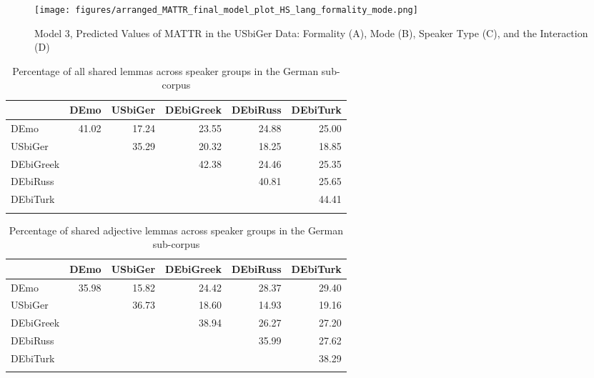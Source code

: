 \documentclass[output=paper,colorlinks,citecolor=brown]{langscibook}
\begin{document}
\begin{figure}[ht]
  \centering
  \texttt{[image: figures/arranged\_MATTR\_final\_model\_plot\_HS\_lang\_formality\_mode.png]}
  \caption{Model 3, Predicted Values of MATTR in the USbiGer Data: Formality (A), Mode (B), Speaker Type (C), and the Interaction (D)}
  \label{fig:kelleretal:MATTR_formality_mode_speakertype_USHGer}
\end{figure}

\begin{table}
\centering
\caption{Percentage of all shared lemmas across speaker groups in the German sub-corpus}
\begin{tabularx}{\textwidth}{Qrrrrr}
\lsptoprule
~ & DEmo & USbiGer & DEbiGreek & DEbiRuss & DEbiTurk\\\midrule
DEmo &  41.02 & 17.24 & 23.55 & 24.88 & 25.00\\
USbiGer & ~ &  35.29 & 20.32 & 18.25 & 18.85\\
DEbiGreek & ~ & ~ &  42.38 & 24.46 & 25.35\\
DEbiRuss & ~ & ~ & ~ &  40.81 & 25.65\\
DEbiTurk & ~ & ~ & ~ & ~ &  44.41 \\
\lspbottomrule
\end{tabularx}
\label{tab:kelleretal:all_Kable_TriangleMatrix_DE}
\end{table}

\begin{table}
\caption{Percentage of shared adjective lemmas across speaker groups in the German sub-corpus}
\begin{tabularx}{\textwidth}{Qrrrrr}
\lsptoprule
~ & DEmo & USbiGer & DEbiGreek & DEbiRuss & DEbiTurk\\\midrule
DEmo &  35.98 & 15.82 & 24.42 & 28.37 & 29.40\\
USbiGer & ~ &  36.73 & 18.60 & 14.93 & 19.16\\
DEbiGreek & ~ & ~ &  38.94 & 26.27 & 27.20\\
DEbiRuss & ~ & ~ & ~ &  35.99 & 27.62\\
DEbiTurk & ~ & ~ & ~ & ~ &  38.29 \\
\lspbottomrule
\end{tabularx}
\label{tab:kelleretal:ADJ_Kable_TriangleMatrix_DE}
\end{table}
\end{document}
